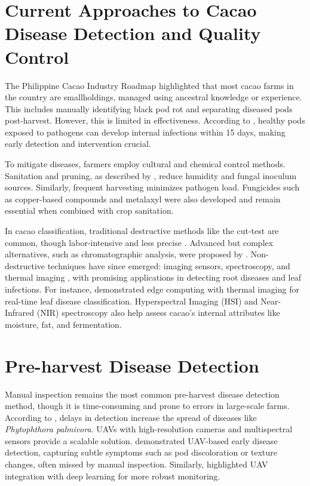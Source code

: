 \section{Current Approaches to Cacao Disease Detection and Quality Control}
The Philippine Cacao Industry Roadmap \cite{PhilCacaoRoadmap2021} highlighted that most cacao farms in the country are smallholdings, managed using ancestral knowledge or experience. This includes manually identifying black pod rot and separating diseased pods post-harvest. However, this is limited in effectiveness. According to \cite{ForestPhytophthora}, healthy pods exposed to pathogens can develop internal infections within 15 days, making early detection and intervention crucial. 

To mitigate diseases, farmers employ cultural and chemical control methods. Sanitation and pruning, as described by \cite{Merga2022}, reduce humidity and fungal inoculum sources. Similarly, frequent harvesting minimizes pathogen load. Fungicides such as copper-based compounds and metalaxyl were also developed and remain essential when combined with crop sanitation.

In cacao classification, traditional destructive methods like the cut-test are common, though labor-intensive and less precise \cite{Nguyen2022}. Advanced but complex alternatives, such as chromatographic analysis, were proposed by \cite{Quelal2020}. Non-destructive techniques have since emerged: imaging sensors, spectroscopy, and thermal imaging \cite{Alvarado2023}, with promising applications in detecting root diseases and leaf infections. For instance, \cite{Silva2024} demonstrated edge computing with thermal imaging for real-time leaf disease classification. Hyperspectral Imaging (HSI) and Near-Infrared (NIR) spectroscopy also help assess cacao’s internal attributes like moisture, fat, and fermentation.

\section{Pre-harvest Disease Detection}
Manual inspection remains the most common pre-harvest disease detection method, though it is time-consuming and prone to errors in large-scale farms. According to \cite{Tan2018}, delays in detection increase the spread of diseases like \textit{Phytophthora palmivora}. UAVs with high-resolution cameras and multispectral sensors provide a scalable solution. \cite{Yadav2024} demonstrated UAV-based early disease detection, capturing subtle symptoms such as pod discoloration or texture changes, often missed by manual inspection. Similarly, \cite{Upadhyay2025} highlighted UAV integration with deep learning for more robust monitoring.

